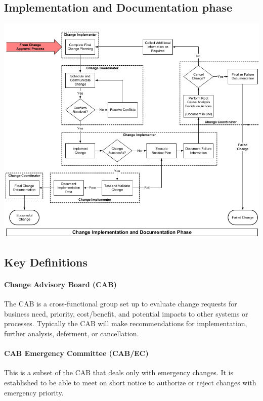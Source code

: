 \documentclass[a4]{article}
\begin{document}
\begin{multicols}{3}
\subsection{Implementation and Documentation phase}
\begin{center}
    \begin{minipage}{\columnwidth}
        \includegraphics[width=\columnwidth]{change-implementation-documentation-phase.png}
    \end{minipage}
\end{center}

\subsection{Key Definitions}
    \paragraph{Change Advisory Board (CAB)} The CAB is a cross-functional group set up to evaluate change requests
    for business need, priority, cost/benefit, and potential impacts to other systems or processes. Typically
    the CAB will make recommendations for implementation, further analysis, deferment, or cancellation.
    \paragraph{CAB Emergency Committee (CAB/EC)} This is a subset of the CAB that deals only with emergency
    changes. It is established to be able to meet on short notice to authorize or reject changes with
    emergency priority.

\end{multicols}
\end{document}
